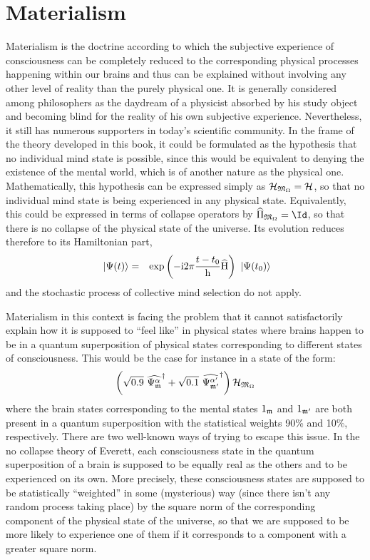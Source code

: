 \documentclass[10pt,a4paper,twoside,openany]{book}
\begin{document}
\section{Materialism}

Materialism is the doctrine according to which the subjective experience of consciousness can be completely reduced to the corresponding physical processes happening within our brains and thus can be explained without involving any other level of reality than the purely physical one. It is generally considered among philosophers as the daydream of a physicist absorbed by his study object and becoming blind for the reality of his own subjective experience. Nevertheless, it still has numerous supporters in today's scientific community. In the frame of the theory developed in this book, it could be formulated as the hypothesis that no individual mind state is possible, since this would be equivalent to denying the existence of the mental world, which is of another nature as the physical one. Mathematically, this hypothesis can be expressed simply as $\mathcal H_{\mathfrak{M}_\Omega} = \mathcal H$, so that no individual mind state is being experienced in any physical state. Equivalently, this could be expressed in terms of collapse operators by $\op{\Pi}_{\cms_\vac} = \Id$, so that there is no collapse of the physical state of the universe. Its evolution reduces therefore to its Hamiltonian part,
\begin{eqnarray*}
\ \left|{\Psi(t)}\right\rangle & = & \mathrm{exp} \left( {- \mathrm{i} 2 \pi \frac{t - t_0} {\mathrm h} \widehat{\mathrm H}} \right) \ \left|{\Psi(t_0)}\right\rangle
\end{eqnarray*}
and the stochastic process of collective mind selection do not apply.

Materialism in this context is facing the problem that it cannot satisfactorily explain how it is supposed to ``feel like'' in physical states where brains happen to be in a quantum superposition of physical states corresponding to different states of consciousness. This would be the case for instance in a state of the form:
\begin{equation*}
\left(\sqrt{0.9}\ \widehat{\Psi_{\mathfrak{m}}^\alpha}^{\dagger} + \sqrt{0.1}\ \widehat{\Psi_{\mathfrak{m}'}^{\alpha'}}^{\dagger}\right) \mathcal H_{\mathfrak{M}_\Omega}
\end{equation*}
where the brain states corresponding to the mental states ${1}_{\mathfrak{m}}$ and ${1}_{\mathfrak{m}'}$ are both present in a quantum superposition with the statistical weights 90\% and 10\%, respectively. There are two well-known ways of trying to escape this issue. In the no collapse theory of Everett, each consciousness state in the quantum superposition of a brain is supposed to be equally real as the others and to be experienced on its own. More precisely, these consciousness states are supposed to be statistically ``weighted'' in some (mysterious) way (since there isn't any random process taking place) by the square norm of the corresponding component of the physical state of the universe, so that we are supposed to be more likely to experience one of them if it corresponds to a component with a greater square norm.
\end{document}
